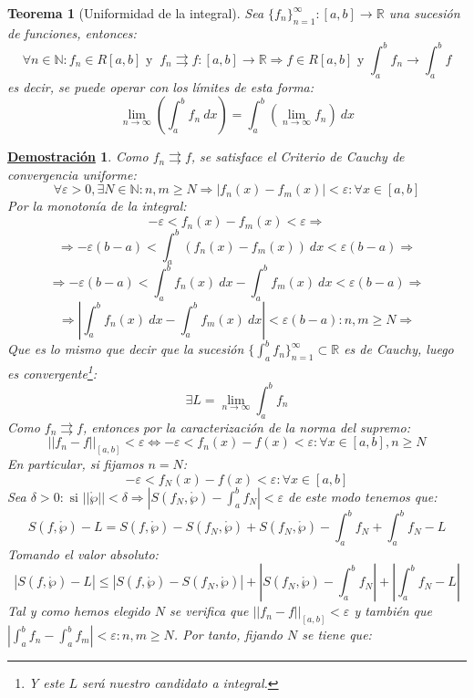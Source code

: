 \documentclass[10pt,a4paper,openright]{book}
\theoremstyle{break}
\newtheorem{theo}{Teorema}[chapter]
\newtheorem*{demo}{\underline{Demostración}}
\newcommand{\dif}[1]{\ d#1}
\begin{document}
\begin{theo}[Uniformidad de la integral]
Sea $\{f_n\}_{n=1}^\infty : [a,b]\rightarrow \mathbb{R}$ una sucesión de funciones, entonces:
$$\forall n\in \mathbb N:  f_n\in R[a,b] \mbox{ y } \ f_n\rightrightarrows f:[a,b]\rightarrow \mathbb{R} \Rightarrow f\in R[a,b]\mbox{ y } \int_{a}^{b} f_n \rightarrow \int_{a}^{b} f$$
es decir, se puede operar con los límites de esta forma:
$$\lim_{n \rightarrow \infty} \left( \int_{a}^{b} f_n \dif{x}\right) = \int_{a}^{b} \left(\lim_{n \rightarrow \infty} f_n\right) \dif{x}$$
\end{theo}
\begin{demo}
Como $f_n \rightrightarrows f$, se satisface el Criterio de Cauchy de convergencia uniforme:
$$\forall \varepsilon >0, \exists N \in \mathbb{N} : n,m \geq N \Rightarrow |f_n (x) - f_m (x) | < \varepsilon : \forall x \in [a,b]$$
Por la monotonía de la integral:
$$- \varepsilon < f_n (x) - f_m (x) < \varepsilon \Rightarrow $$
$$\Rightarrow - \varepsilon (b - a) < \int_{a}^{b} (f_n (x) - f_m (x)) \dif{x} < \varepsilon (b - a) \Rightarrow$$
$$\Rightarrow - \varepsilon (b - a) < \int_{a}^{b} f_n (x) \dif{x} - \int_{a}^{b}  f_m (x) \dif{x} < \varepsilon (b - a) \Rightarrow$$
$$\Rightarrow \left|\int_{a}^{b} f_n (x) \dif{x} - \int_{a}^{b}  f_m (x) \dif{x}\right| <  \varepsilon (b - a) : n , m \geq N \Rightarrow$$
Que es lo mismo que decir que la sucesión $\{\int_{a}^{b} f_n\}_{n=1}^\infty \subset \mathbb{R}$ es de Cauchy, luego es convergente\footnote{Y este $L$ será nuestro candidato a integral.}:
$$\exists L = \lim_{n \to \infty} \int_{a}^{b} f_n $$
Como $f_n \rightrightarrows f$, entonces por la caracterización de la norma del supremo:
$$|| f_n - f ||_{[a,b]}  < \varepsilon \Leftrightarrow - \varepsilon < f_n (x) - f(x) < \varepsilon : \forall x \in [a,b], n \geq N $$
En particular, si fijamos $n = N $:
$$- \varepsilon < f_N (x) - f(x) < \varepsilon : \forall x \in [a,b]$$
Sea $\delta > 0 : \mbox{ si } ||\mathring{\wp} || < \delta \Rightarrow |S(f_N, \mathring{\wp}) - \int_{a}^{b} f_N| < \varepsilon$ de este modo tenemos que:
$$S(f, \mathring{\wp}) - L = S(f, \mathring{\wp}) - S(f_N, \mathring{\wp}) + S(f_N, \mathring{\wp}) - \int_{a}^{b} f_N + \int_{a}^{b} f_N - L $$
Tomando el valor absoluto:
$$|S(f, \mathring{\wp}) - L| \leq |S(f, \mathring{\wp}) - S(f_N, \mathring{\wp})| + \left|S(f_N, \mathring{\wp}) - \int_{a}^{b} f_N\right| + \left|\int_{a}^{b} f_N - L\right| $$
Tal y como hemos elegido $N$ se verifica que $|| f_n - f ||_{[a,b]}  < \varepsilon$ y también que $|\int_{a}^{b} f_n - \int_{a}^{b} f_m| < \varepsilon : n, m \geq N$. Por tanto, fijando $N$ se tiene que:

\end{demo}
\end{document}

